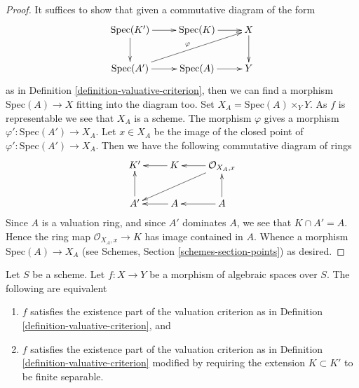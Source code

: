 \begin{proof}
It suffices to show that given a commutative diagram of the form
$$
\xymatrix{
\text{Spec}(K') \ar[r] \ar[d] & \text{Spec}(K) \ar[r] & X \ar[d] \\
\text{Spec}(A') \ar[r] \ar[rru]^\varphi &\text{Spec}(A) \ar[r] & Y
}
$$
as in Definition \ref{definition-valuative-criterion}, then we can
find a morphism $\text{Spec}(A) \to X$ fitting into the diagram too.
Set $X_A = \text{Spec}(A) \times_Y Y$. As $f$ is representable we see
that $X_A$ is a scheme. The morphism $\varphi$ gives a morphism
$\varphi' : \text{Spec}(A') \to X_A$. Let $x \in X_A$ be the image of
the closed point of $\varphi' : \text{Spec}(A') \to X_A$. Then we
have the following commutative diagram of rings
$$
\xymatrix{
K' & K \ar[l] & \mathcal{O}_{X_A, x} \ar[l] \ar[lld] \\
A' \ar[u] & A \ar[l] & A \ar[l] \ar[u]
}
$$
Since $A$ is a valuation ring, and since $A'$ dominates $A$, we see
that $K \cap A' = A$. Hence the ring map $\mathcal{O}_{X_A, x} \to K$
has image contained in $A$. Whence a morphism $\text{Spec}(A) \to X_A$ (see
Schemes, Section \ref{schemes-section-points})
as desired.
\end{proof}

\begin{lemma}
\label{lemma-finite-separable-enough}
Let $S$ be a scheme.
Let $f : X \to Y$ be a morphism of algebraic spaces over $S$.
The following are equivalent
\begin{enumerate}
\item $f$ satisfies the existence part of the valuation criterion
as in Definition \ref{definition-valuative-criterion}, and
\item $f$ satisfies the existence part of the valuation criterion
as in Definition \ref{definition-valuative-criterion} modified by
requiring the extension $K \subset K'$ to be finite separable.
\end{enumerate}
\end{lemma}

